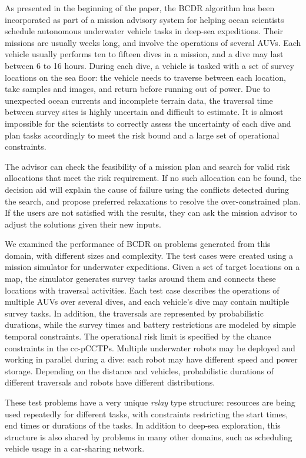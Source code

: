 \documentclass[jair,twoside,11pt,theapa]{article}
\begin{document}
As presented in the beginning of the paper, the BCDR algorithm has been
incorporated as part of a mission advisory system for helping ocean scientists
schedule autonomous underwater vehicle tasks in deep-sea expeditions. Their
missions are usually weeks long, and involve the operations of several
AUVs. Each vehicle usually performs ten to fifteen dives in a
mission, and a dive may last between 6 to 16 hours. During each dive, a
vehicle is tasked with a set of survey locations on the sea floor: the vehicle needs
to traverse between each location, take samples and images, and return before running
out of power. Due to unexpected ocean currents and incomplete terrain data, the
traversal time between survey sites is highly uncertain and difficult to
estimate. It is almost impossible for the scientists to correctly assess the
uncertainty of each dive and plan tasks accordingly to meet the risk bound and a
large set of operational constraints.


The advisor can check the feasibility
of a mission plan and search for valid risk allocations that meet the risk
requirement. If no such allocation can be found, the decision aid will explain
the cause of failure using the conflicts detected during the search, and propose
preferred relaxations to resolve the over-constrained plan. If the users are not
satisfied with the results, they can ask the mission advisor to adjust the
solutions given their new inputs. 


We examined the performance of BCDR on problems generated from this domain, with
different sizes and complexity. The test cases were created using a mission
simulator for underwater expeditions. Given a set of target locations on a map,
the simulator generates survey tasks around them and connects these locations
with traversal activities. Each test case describes the operations of multiple
AUVs over several dives, and each vehicle's dive may contain multiple survey
tasks. In addition, the traversals are represented by probabilistic durations,
while the survey times and battery restrictions are modeled by simple temporal
constraints. The operational risk limit is specified by the chance constraints
in the cc-pCCTPs. Multiple underwater robots may be deployed and working in
parallel during a dive: each robot may have different speed and power storage.
Depending on the distance and vehicles, probabilistic durations of different
traversals and robots have different distributions.


These test problems have a very unique \textit{relay} type structure: resources
are being used repeatedly for different tasks, with constraints restricting the
start times, end times or durations of the tasks. In addition to deep-sea
exploration, this structure is also shared by problems in many other domains,
such as scheduling vehicle usage in a car-sharing network.
\end{document}
